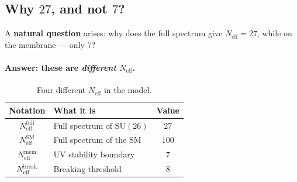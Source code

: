 \documentclass[11pt,a4paper]{article}
\newcommand{\SU}{\mathrm{SU}}
\newcommand{\Neff}{N_{\text{eff}}}
\theoremstyle{definition}
\begin{document}
\subsection{Why $27$, and not $7$?}
\label{subsec:why-27-not-7}

A \textbf{natural question} arises: why does the full spectrum 
give $\Neff = 27$, while on the membrane — only $7$?

\paragraph{Answer: these are \emph{different} $N_{\text{eff}}$.}

\begin{table}[htbp]
\centering
\caption{Four different $N_{\text{eff}}$ in the model.}
\label{tab:four-neff}
\begin{tabular}{clc}
\toprule
Notation & What it is & Value \\
\midrule
$\Neff^{\text{full}}$ & Full spectrum of $\SU(26)$ & $27$ \\
$\Neff^{\text{SM}}$ & Full spectrum of the SM & $100$ \\
$\Neff^{\text{mem}}$ & UV stability boundary & $7$ \\
$\Neff^{\text{break}}$ & Breaking threshold & $8$ \\
\bottomrule
\end{tabular}
\end{table}
\end{document}
